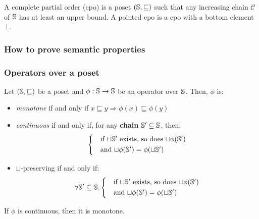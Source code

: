 \documentclass[toc]{../cs-classes/cs-classes}
\begin{document}
\begin{definition}
    A complete partial order (cpo) is a poset $(\S, \sqsubseteq)$ such that any increasing chain $\mathcal{C}$ of $\S$ has at least an upper bound. A pointed cpo is a cpo with a bottom element $\bot$.
\end{definition}

\subsubsection{How to prove semantic properties}

\subsubsection{Operators over a poset}
\begin{definition}
    Let $(\S, \sqsubseteq)$ be a poset and $\phi:\S\to\S$ be an operator over $\S$. Then, $\phi$ is:
    \begin{itemize}
        \item \emph{monotone} if and only if $x\sqsubseteq y\Rightarrow \phi(x)\sqsubseteq\phi(y)$
        \item \emph{continuous} if and only if, for any \textbf{chain} $\S'\subseteq \S$, then:
        \begin{equation*}
            \begin{cases*}
                &if $\sqcup\S'$ exists, so does $\sqcup\phi(\S')$\\
                &and $\sqcup\phi(\S')=\phi(\sqcup\S')$
            \end{cases*}
        \end{equation*}
        \item $\sqcup$-preserving if and only if:
        \begin{equation*}
            \forall\S'\subseteq\S, \begin{cases*}
                &if $\sqcup\S'$ exists, so does $\sqcup\phi(\S')$\\
                &and $\sqcup\phi(\S')=\phi(\sqcup\S')$
            \end{cases*}
        \end{equation*}
    \end{itemize}
\end{definition}

\begin{property}
    If $\phi$ is continuous, then it is monotone.
\end{property}
\end{document}
